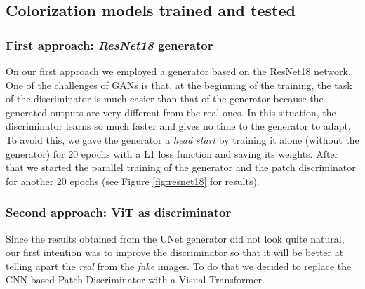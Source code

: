 \documentclass[
]{article}
\begin{document}
\hypertarget{colorization-models-trained-and-tested}{%
\subsection{Colorization models trained and
tested}\label{colorization-models-trained-and-tested}}

\hypertarget{first-approach-resnet18-generator}{%
\subsubsection{\texorpdfstring{First approach: \emph{ResNet18}
generator}{First approach: ResNet18 generator}}\label{first-approach-resnet18-generator}}

On our first approach we employed a generator based on the ResNet18
network. One of the challenges of GANs is that, at the beginning of the
training, the task of the discriminator is much easier than that of the
generator because the generated outputs are very different from the real
ones. In this situation, the discriminator learns so much faster and
gives no time to the generator to adapt. To avoid this, we gave the
generator a \emph{head start} by training it alone (without the
generator) for 20 epochs with a L1 loss function and saving its weights.
After that we started the parallel training of the generator and the
patch discriminator for another 20 epochs (see Figure \ref{fig:resnet18} for results).

\hypertarget{second-approach-vit-as-discriminator}{%
\subsubsection{Second approach: ViT as
discriminator}\label{second-approach-vit-as-discriminator}}

Since the results obtained from the UNet generator did not look quite
natural, our first intention was to improve the discriminator so that it
will be better at telling apart the \emph{real} from the \emph{fake}
images. To do that we decided to replace the CNN based Patch
Discriminator with a Visual Transformer.
\end{document}

